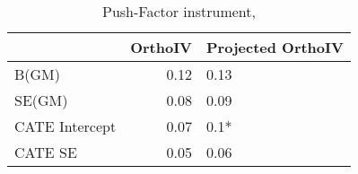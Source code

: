 \begin{table}\centering\caption{Push-Factor instrument, }\begin{tabular}{lrl}
\toprule
                &   OrthoIV & Projected OrthoIV   \\
\midrule
 B(GM)          &      0.12 & 0.13                \\
 SE(GM)         &      0.08 & 0.09                \\
 CATE Intercept &      0.07 & 0.1*                \\
 CATE SE        &      0.05 & 0.06                \\
\bottomrule
\end{tabular}\end{table}